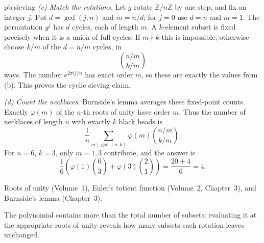 \begin{solution}{pb:sieving}
\emph{(c) Match the rotations.}
Let $g$ rotate $\mathbb Z/n\mathbb Z$ by one step, and fix an integer $j$. Put $d=\gcd(j,n)$ and $m=n/d$; for $j=0$ use $d=n$ and $m=1$. The permutation $g^j$ has $d$ cycles, each of length $m$. A $k$-element subset is fixed precisely when it is a union of full cycles. If $m\nmid k$ this is impossible; otherwise choose $k/m$ of the $d=n/m$ cycles, in
\[
\binom{n/m}{k/m}
\]
ways. The number $e^{2\pi i j/n}$ has exact order $m$, so these are exactly the values from (b). This proves the cyclic sieving claim.

\emph{(d) Count the necklaces.}
Burnside's lemma averages these fixed-point counts. Exactly $\varphi(m)$ of the $n$-th roots of unity have order $m$. Thus the number of necklaces of length $n$ with exactly $k$ black beads is
\[
\boxed{\frac1n\sum_{m\mid\gcd(n,k)}
\varphi(m)\binom{n/m}{k/m}}.
\]
For $n=6$, $k=3$, only $m=1,3$ contribute, and the answer is
\[
\frac16\left(\varphi(1)\binom63+
\varphi(3)\binom21\right)=\frac{20+4}6=\boxed4.
\]

\tools Roots of unity (Volume~1), Euler's totient function (Volume~2, Chapter~3), and Burnside's lemma (Chapter~3).

\leads The polynomial contains more than the total number of subsets: evaluating it at the appropriate roots of unity reveals how many subsets each rotation leaves unchanged.
\end{solution}

